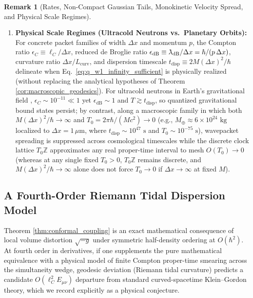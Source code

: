 \documentclass[11pt, a4paper]{article}
\theoremstyle{definition}
\newtheorem{remark}[theorem]{Remark}
\providecommand{\lambdabar}{{\mkern0.75mu\mathchar'26\mkern-9.75mu\lambda}}
\begin{document}
\begin{remark}[Rates, Non-Compact Gaussian Tails, Monokinetic Velocity Spread, and Physical Scale Regimes]
\begin{enumerate}[label=(\arabic*)]
    \item \textbf{Physical Scale Regimes (Ultracold Neutrons vs.\ Planetary Orbits):} For concrete packet families of width $\Delta x$ and momentum $p$, the Compton ratio $\epsilon_C \equiv \ell_C / \Delta x$, reduced de Broglie ratio $\epsilon_{\text{dB}} \equiv \lambdabar_{\text{dB}} / \Delta x = \hbar/(p\,\Delta x)$, curvature ratio $\Delta x / L_{\text{curv}}$, and dispersion timescale $t_{\text{disp}} \equiv 2M(\Delta x)^2 / \hbar$ delineate when Eq.~\eqref{eq:q_w1_infinity_sufficient} is physically realized (without replacing the analytical hypotheses of Theorem \ref{cor:macroscopic_geodesics}). For ultracold neutrons in Earth's gravitational field \cite{Nesvizhevsky2002}, $\epsilon_C \sim 10^{-11} \ll 1$ yet $\epsilon_{\text{dB}} \sim 1$ and $T \gtrsim t_{\text{disp}}$, so quantized gravitational bound states persist; by contrast, along a macroscopic family in which both $M(\Delta x)^2 / \hbar \to \infty$ and $T_0 = 2\pi\hbar/(Mc^2) \to 0$ (e.g., $M_\oplus \approx 6 \times 10^{24}\text{ kg}$ localized to $\Delta x = 1\,\mu\text{m}$, where $t_{\text{disp}} \sim 10^{47}\text{ s}$ and $T_0 \sim 10^{-75}\text{ s}$), wavepacket spreading is suppressed across cosmological timescales while the discrete clock lattice $T_0\mathbb{Z}$ approximates any real proper-time interval to mesh $O(T_0) \to 0$ (whereas at any single fixed $T_0 > 0$, $T_0\mathbb{Z}$ remains discrete, and $M(\Delta x)^2/\hbar \to \infty$ alone does not force $T_0 \to 0$ if $\Delta x \to \infty$ at fixed $M$).
\end{enumerate}
\end{remark}

\subsection{A Fourth-Order Riemann Tidal Dispersion Model}
\label{sec:tidal_model}

Theorem \ref{thm:conformal_coupling} is an exact mathematical consequence of local volume distortion $\sqrt{-g}$ under symmetric half-density ordering at $O(\hbar^2)$. At fourth order in derivatives, if one supplements the pure mathematical equivalence with a physical model of finite Compton proper-time smearing across the simultaneity wedge, geodesic deviation (Riemann tidal curvature) predicts a candidate $O(\ell_C^2 E_{\mu\nu})$ departure from standard curved-spacetime Klein--Gordon theory, which we record explicitly as a physical conjecture.
\end{document}
